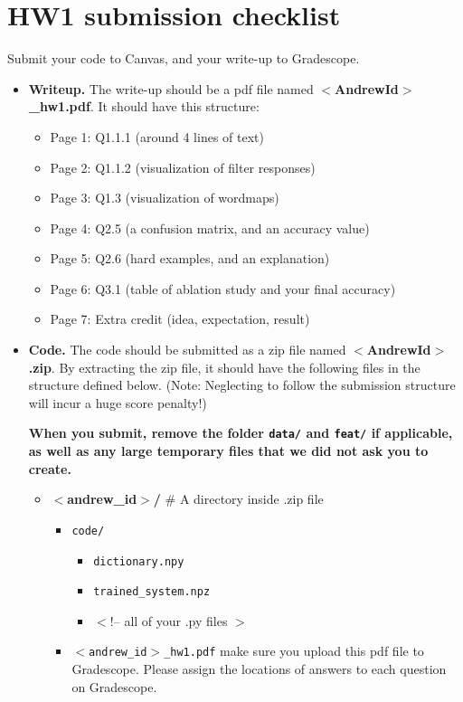 \documentclass[10pt]{article}
\begin{document}
\section{HW1 submission checklist}
\label{sec:SubChecklist}
Submit your code to Canvas, and your write-up to Gradescope.
\begin{itemize}
\item {\bf Writeup.}
  The write-up should be a pdf file named {\bf $<$AndrewId$>$\_hw1.pdf}. It should have this structure:
  \begin{itemize}
  \item Page 1: Q1.1.1 (around 4 lines of text)
  \item Page 2: Q1.1.2 (visualization of filter responses)
  \item Page 3: Q1.3 (visualization of wordmaps)
  \item Page 4: Q2.5 (a confusion matrix, and an accuracy value)
  \item Page 5: Q2.6 (hard examples, and an explanation)
  \item Page 6: Q3.1 (table of ablation study and your final accuracy)
  \item Page 7: Extra credit (idea, expectation, result)
  \end{itemize}
\item {\bf Code.} 
The code should be submitted as a zip file named {\bf $<$AndrewId$>$.zip}. By extracting the zip file, it should have the following files in the structure defined below. (Note: Neglecting to follow the submission structure will incur a huge score penalty!)

{\bf When you submit, remove the folder {\tt data/} and {\tt feat/} if applicable, as well as any large temporary files that we did not ask you to create.}

\begin{itemize}
\item {\bf $<$andrew\_id$>$/ }  \# A directory inside .zip file
\begin{itemize}
	\item {\tt code/ }
	\begin{itemize}
		\item {\tt dictionary.npy }
		\item {\tt trained\_system.npz }
		\item $<$!-- all of your .py files $>$
	\end{itemize}
    \item {\tt $<$andrew\_id$>$\_hw1.pdf}  make sure you upload this pdf file to Gradescope. Please assign the locations of answers to each question on Gradescope.
\end{itemize}

\end{itemize}
\end{itemize}




\end{document}
